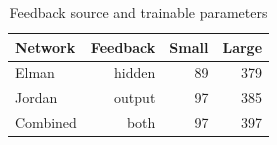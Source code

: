 \begin{table}[t]
\caption{Feedback source and trainable parameters}
\label{tab:architectures}
\centering\small
\begin{tabular}{lrrr}
\toprule
Network & Feedback & Small & Large \\
\midrule
Elman & hidden & 89 & 379 \\
Jordan & output & 97 & 385 \\
Combined & both & 97 & 397 \\
\bottomrule
\end{tabular}
\end{table}
